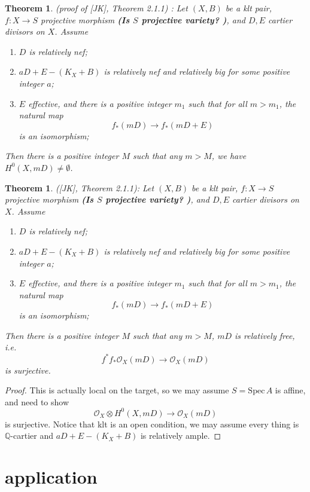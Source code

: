 \documentclass{article}
\newtheorem{thm}[defn]{Theorem}
\begin{document}
\begin{thm}
	(proof of [JK], Theorem 2.1.1) : Let $ (X,B) $ be a klt pair, $ f:X\to S $ projective morphism \textbf{(Is $ S $ projective variety? )}, and $ D,E $ cartier divisors on $ X $. Assume
	\begin{enumerate}
		\item $ D $ is relatively nef;
		\item $ aD+E-(K_X+B) $ is relatively nef and relatively big for some positive integer $ a $;
		\item $ E $ effective, and there is a positive integer $ m_1 $ such that for all $ m>m_1 $, the natural map 
		$$ f_*(mD)\to f_*(mD+E) $$
		is an isomorphism;
	\end{enumerate}
	Then there is a positive integer $ M $ such that any $ m>M $, we have $ H^0(X,mD)\neq \emptyset $.
\end{thm}

\begin{thm}
	([JK], Theorem 2.1.1): Let $ (X,B) $ be a klt pair, $ f:X\to S $ projective morphism \textbf{(Is $ S $ projective variety? )}, and $ D,E $ cartier divisors on $ X $. Assume
	\begin{enumerate}
		\item $ D $ is relatively nef;
		\item $ aD+E-(K_X+B) $ is relatively nef and relatively big for some positive integer $ a $;
		\item $ E $ effective, and there is a positive integer $ m_1 $ such that for all $ m>m_1 $, the natural map 
		$$ f_*(mD)\to f_*(mD+E) $$
		is an isomorphism;
	\end{enumerate}
	Then there is a positive integer $ M $ such that any $ m>M $, $ mD $ is relatively free, i.e.
	$$ f^*f_*\mathcal{O}_X(mD)\to \mathcal{O}_X(mD) $$
	is surjective.
\end{thm}
\begin{proof}
	This is actually local on the target, so we may assume $ S=\mathrm{Spec}\,A $ is affine, and need to show 
	$$ \mathcal{O}_X \otimes H^0(X,mD)\to \mathcal{O}_X(mD)$$
	is surjective. Notice that klt is an open condition, we may assume every thing is $ \mathbb{Q} $-cartier and $ aD+E-(K_X+B) $ is relatively ample. 
\end{proof}
\section{application}
\end{document}
